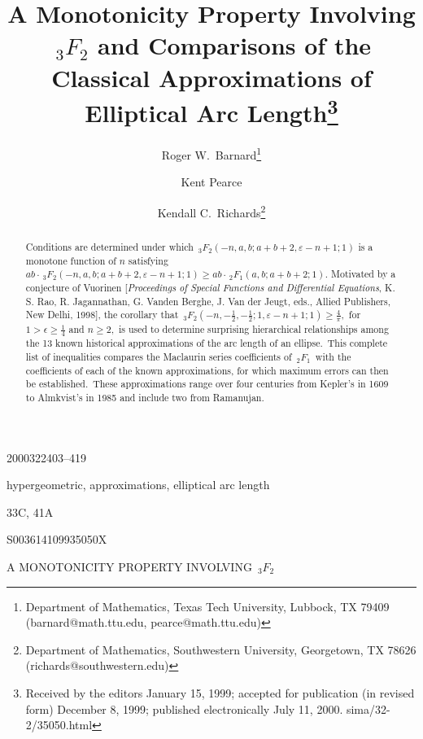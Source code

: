\documentclass[final,oneeqnum]{siamltex}
\title{A Monotonicity Property Involving
\protect\boldmath$\,_{3}F_{2}$ and Comparisons of the Classical Approximations
of Elliptical Arc Length\thanks{Received by the editors January 15, 1999;
accepted for publication (in revised form) December 8, 1999; published
electronically July 11, 2000.
\URL sima/32-2/35050.html}}
\author{Roger W.\ Barnard\thanks{Department of 
Mathematics, Texas Tech University, 
Lubbock, TX  79409 
(barnard@\break math.ttu.edu, pearce@math.ttu.edu)} 
\and Kent Pearce\footnotemark[2]
\and Kendall C.\ Richards\thanks {Department of 
Mathematics, Southwestern University, 
Georgetown, TX 78626 (richards@\break southwestern.edu) }}
\begin{document}
\maketitle
\vspace{-1.35in}
 {2000}{32}{2}{403--419}
\vspace{1.05in}

\setcounter{page}{403}

\begin{abstract}
Conditions are determined under which
$  \,_{3}F_{2}\left(-n,a,b;a+b+2,\varepsilon -n+1;1\right)$
is a monotone  function of $n$ satisfying
$a b\cdot\,_{3}F_{2}\left(-n,a,b;a+b+2,\varepsilon -n+1;1\right)
 \geq a b\cdot\,_{2}F_{1}\left(a,b;a+b+2;1\right).$ Motivated by
 a conjecture of Vuorinen [{\it Proceedings of Special Functions and
Differential Equations}, K. S. Rao, R. Jagannathan, G. Vanden Berghe, J. Van der Jeugt, eds., 
Allied Publishers, New Delhi, 1998], the corollary that
$\,_{3}F_{2}(-n,-\frac{1}{2},-\frac{1}{2};1,\varepsilon -n+1;1)
\geq \frac{4}{\pi},$  for $1>\epsilon
\geq\frac{1}{4}$ and $n\geq 2,$ is used to determine surprising
hierarchical relationships among the 13 known historical approximations
 of the  arc length of an ellipse.\ This
 complete list of inequalities  compares
  the  Maclaurin series coefficients of  $\,_{2}F_{1}\,$
  with the coefficients of each of the  known approximations,
 for which maximum errors
 can then be established.\ These approximations range over
four centuries from Kepler's in 1609 to Almkvist's in 1985
and include two from Ramanujan.
\end{abstract}

\begin{keywords} 
hypergeometric, approximations, elliptical arc length 
\end{keywords}

\begin{AMS}
33C, 41A
\end{AMS}

\begin{PII}
S003614109935050X
\end{PII}

\pagestyle{myheadings}
\thispagestyle{plain}
{A MONOTONICITY PROPERTY INVOLVING $\,_{3}F_{2}$}
\end{document}
